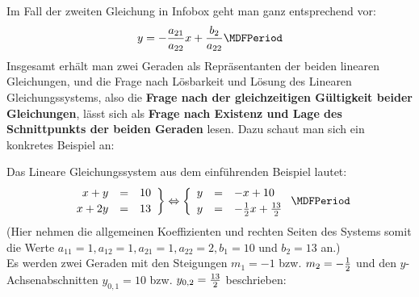 \begin{MIntro}
Im Fall der zweiten Gleichung in Infobox  geht man ganz entsprechend vor:
$$y = - \Mdfrac{a_{21}}{a_{22}} x + \Mdfrac{b_2}{a_{22}} \MDFPeriod$$
Insgesamt erhält man zwei Geraden als Repräsentanten der beiden linearen Gleichungen, und die Frage nach Lösbarkeit und Lösung
des Linearen Gleichungssystems, also die \textbf{Frage nach der
gleichzeitigen Gültigkeit beider Gleichungen}, lässt sich als \textbf{Frage nach Existenz und %
Lage des Schnittpunkts der beiden Geraden} lesen. Dazu schaut man sich ein konkretes Beispiel an:%

\begin{MExample}
Das Lineare Gleichungssystem aus dem einführenden Beispiel  lautet:
$$\left. \begin{array}{rcl} x + y & = & 10 \\[.5ex] x + 2 y & = & 13 \end{array} \right\} \Leftrightarrow
\left\{ \begin{array}{rcl} y & = & - x + 10 \\[.5ex] y & = & - \Mtfrac12 x + \Mtfrac{13}{2} \end{array} \right. \MDFPeriod$$
(Hier nehmen die allgemeinen Koeffizienten und rechten Seiten des Systems  somit die
Werte $a_{11} = 1, a_{12} = 1, a_{21} = 1, a_{22} = 2, b_1 = 10$ und $b_2 = 13$ an.)\\
Es werden zwei Geraden mit den Steigungen $m_{1} = - 1$ bzw. $m_{2} = - \tfrac{1}{2}$ und den $y$-Achsenabschnitten
$y_{0,1} = 10$ bzw. $y_{0,2} = \tfrac{13}{2}$ beschrieben:
\begin{center}
\end{center}
\end{MExample}
\end{MIntro}
